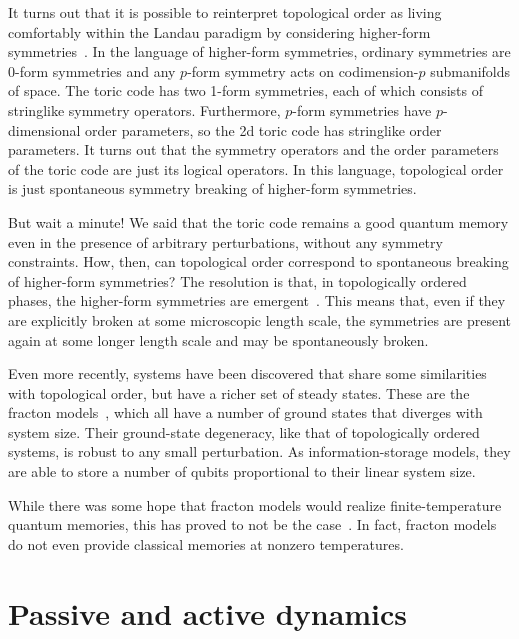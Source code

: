 It turns out that it is possible to reinterpret topological order as living comfortably within the Landau paradigm by considering higher-form symmetries~\cite{Nussinov2009Symmetry, Gaiotto2015Generalized, Lake2018Higher, McGreevy2022Generalized, Cordova2022Generalized}. In the language of higher-form symmetries, ordinary symmetries are 0-form symmetries and any $p$-form symmetry acts on codimension-$p$ submanifolds of space. The toric code has two 1-form symmetries, each of which consists of stringlike symmetry operators. Furthermore, $p$-form symmetries have $p$-dimensional order parameters, so the 2d toric code has stringlike order parameters. It turns out that the symmetry operators and the order parameters of the toric code are just its logical operators. In this language, topological order is just spontaneous symmetry breaking of higher-form symmetries.


But wait a minute! We said that the toric code remains a good quantum memory even in the presence of arbitrary perturbations, without any symmetry constraints. How, then, can topological order correspond to spontaneous breaking of higher-form symmetries? The resolution is that, in topologically ordered phases, the higher-form symmetries are emergent~\cite{Wen2019Higher}. This means that, even if they are explicitly broken at some microscopic length scale, the symmetries are present again at some longer length scale and may be spontaneously broken.

Even more recently, systems have been discovered that share some similarities with topological order, but have a richer set of steady states. These are the fracton models~\cite{Chamon2005Glassiness, Bravyi2011Order, Haah2011Code, Vijay2016Fracton,  NandkishoreHermele2019,Pretko2020Fracton}, which all have a number of ground states that diverges with system size. Their ground-state degeneracy, like that of topologically ordered systems, is robust to any small perturbation. As information-storage models, they are able to store a number of qubits proportional to their linear system size.

While there was some hope that fracton models would realize finite-temperature quantum memories, this has proved to not be the case~\cite{PremHaahNandkishore2017, Siva2017Marginally}. In fact, fracton models do not even provide classical memories at nonzero temperatures.

\section{Passive and active dynamics}

